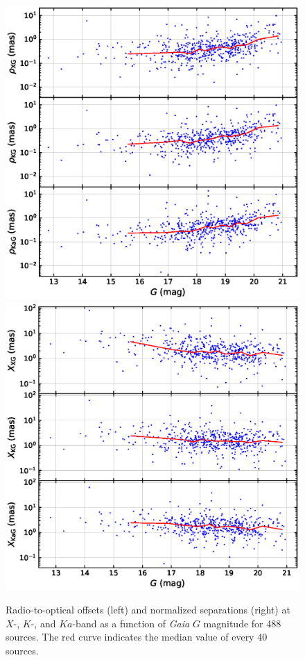 \documentclass[referee]{aa}        %
\begin{document}
    \begin{figure}[hbtp]
        \centering
        \includegraphics[width=0.7\columnwidth]{figs/rho-g-mag}
        \includegraphics[width=0.7\columnwidth]{figs/X-g-mag}
        \caption[]{\label{fig:rho-g-mag}
            Radio-to-optical offsets (left) and normalized separations (right) at $X$-, $K$-, and $Ka$-band as a function of \textit{Gaia} $G$ magnitude for 488 sources.
            The red curve indicates the median value of every 40 sources.
        }
    \end{figure}
\end{document}
